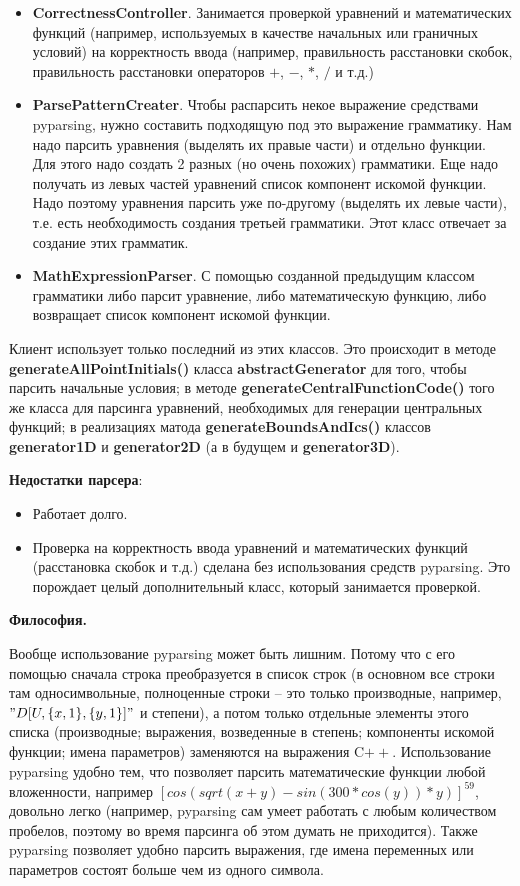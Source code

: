 \documentclass[a4paper]{article}
\begin{document}
\begin{itemize}
\item {\bf CorrectnessController}. Занимается проверкой уравнений и ма\-те\-ма\-ти\-чес\-ких функций (например, используемых в качестве начальных или граничных условий) на корректность ввода (например, пра\-виль\-ность расстановки скобок, правильность расстановки операторов $+$, $-$, $*$, $/$ и т.д.)
\item {\bf ParsePatternCreater}. Чтобы распарсить некое выражение сред\-ства\-ми pyparsing, нужно составить подходящую под это выражение грамматику. Нам надо парсить уравнения (выделять их правые части) и отдельно функции. Для этого надо создать 2 разных (но очень похожих) грамматики. Еще надо получать из левых частей уравнений список компонент искомой функции. Надо поэтому уравнения пар\-сить уже по-другому (выделять их левые части), т.е. есть не\-об\-хо\-ди\-мость создания третьей грамматики. Этот класс отвечает за создание этих грамматик.
\item {\bf MathExpressionParser}. С помощью созданной предыдущим клас\-сом грамматики либо парсит уравнение, либо математическую функ\-цию, либо возвращает список компонент искомой функции.
\end{itemize}
Клиент использует только последний из этих классов. Это происходит в методе {\bf generateAllPointInitials()} класса {\bf abstractGenerator} для того, чтобы пар\-сить начальные условия; в методе {\bf generateCentralFunctionCode()} того же класса для парсинга уравнений, необходимых для генерации центр\-аль\-ных функций; в реализациях матода {\bf generateBoundsAndIcs()} клас\-сов {\bf generator1D} и {\bf generator2D} (а в будущем и {\bf generator3D}).

\bigskip
{\bf Недостатки парсера}:
\begin{itemize}
\item Работает долго.
\item Проверка на корректность ввода уравнений и математических функ\-ций (расстановка скобок и т.д.) сделана без использования средств pyparsing. Это порождает целый дополнительный класс, который занимается проверкой.
\end{itemize}

{\bf Философия.}

Вообще использование pyparsing может быть лишним. Потому что с его помощью сначала строка преобразуется в список строк (в основном все строки там односимвольные, полноценные строки -- это только производные, например, $"D[U,\{x,1\},\{y,1\}]"$ и степени), а потом только отдельные элементы этого списка (производные; выражения, возведенные в степень; компоненты искомой функции; имена параметров) заменяются на выражения C$++$. Использование pyparsing удобно тем, что позволяет парсить математические функции любой вложенности, например $[cos(sqrt(x + y) - sin(300 * cos(y)) * y)]^{59}$, довольно легко (например, pyparsing сам умеет работать с любым количеством пробелов, поэтому во время парсинга об этом думать не приходится). Также pyparsing позволяет удобно парсить выражения, где имена переменных или параметров состоят больше чем из одного символа.
\end{document}
